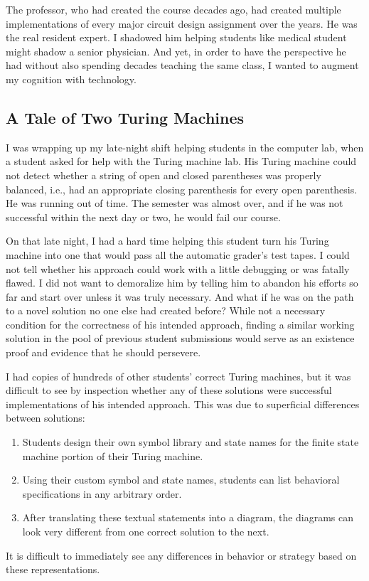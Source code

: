 The professor, who had created the course decades ago, had created multiple implementations of every major circuit design assignment over the years. He was the real resident expert. I shadowed him helping students like medical student might shadow a senior physician. And yet, in order to have the perspective he had without also spending decades teaching the same class, I wanted to augment my cognition with technology. 

\subsection{A Tale of Two Turing Machines}

I was wrapping up my late-night shift helping students in the computer lab, when a student asked for help with the Turing machine lab. His Turing machine could not detect whether a string of open and closed parentheses was properly balanced, i.e., had an appropriate closing parenthesis for every open parenthesis. He was running out of time. The semester was almost over, and if he was not successful within the next day or two, he would fail our course.

On that late night, I had a hard time helping this student turn his Turing machine into one that would pass all the automatic grader's test tapes. I could not tell whether his approach could work with a little debugging or was fatally flawed. I did not want to demoralize him by telling him to abandon his efforts so far and start over unless it was truly necessary. And what if he was on the path to a novel solution no one else had created before? While not a necessary condition for the correctness of his intended approach, finding a similar working solution in the pool of previous student submissions would serve as an existence proof and evidence that he should persevere. 

I had copies of hundreds of other students' correct Turing machines, but it was difficult to see by inspection whether any of these solutions were successful implementations of his intended approach. This was due to superficial differences between solutions: 
\begin{enumerate}
\item Students design their own symbol library and state names for the finite state machine portion of their Turing machine. 
\item Using their custom symbol and state names, students can list behavioral specifications in any arbitrary order. 
\item After translating these textual statements into a diagram, the diagrams can look very different from one correct solution to the next. 
\end{enumerate}
It is difficult to immediately see any differences in behavior or strategy based on these representations.


